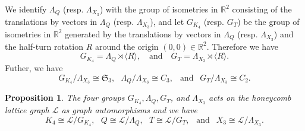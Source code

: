 \documentclass[lualatex,12pt]{article}
\newtheorem{prop}{Proposition}
\begin{document}
 We identify $\Lambda_Q$ (resp. $\Lambda_{X_3}$) with the group of isometries in ${\mathbb R}^2$
 consisting of the translations by vectors in $\Lambda_Q$ (resp. $\Lambda_{X_3}$),
 and let $G_{K_4}$ (resp. $G_T$) be the group of isometries in ${\mathbb R}^2$ generated by
 the translations by vectors in $\Lambda_{Q}$ (resp. $\Lambda_{X_3}$)
 and the half-turn rotation $R$
 around the origin $(0,0)\in {\mathbb R}^2$.
 Therefore we have
 \[
  G_{K_4} = \Lambda_{Q}\rtimes \langle{R}\rangle,
 \mbox {~~ and ~~}
 G_{T} = \Lambda_{X_3}\rtimes \langle{R}\rangle.
 \]
 Futher, we have
 \[
  G_{K_4}/\Lambda_{X_3} \cong {\mathfrak S}_3,~~~
  \Lambda_{Q}/\Lambda_{X_3} \cong C_3,~~\mbox{ and } ~~
  G_{T}/\Lambda_{X_3} \cong C_2.
 \]
\begin{prop}
 \label{prop:geom}
 The four groups $G_{K_4}, \Lambda_Q, G_T$, and $\Lambda_{X_3}$
 acts on the honeycomb lattice graph ${\mathcal L}$ as
 graph automorphisms and we have
 \[
 K_4 \cong {\mathcal L}/G_{K_4},~~~
 Q\cong {\mathcal L}/\Lambda_{Q},~~~
 T \cong {\mathcal L}/G_{T},~~\mbox{ and } ~~
 X_3 \cong {\mathcal L}/\Lambda_{X_3}.
 \]
\end{prop}
\end{document}
